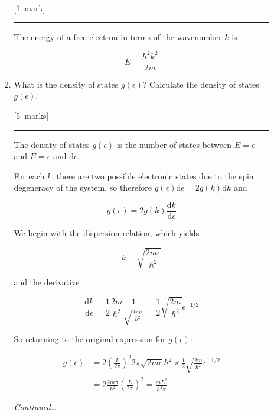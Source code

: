 \documentclass[12pt,a4paper]{article}
\newcommand{\sepline}[0]{\par \hfil\rule{10cm}{0.4pt} \vspace*{\parskip}\hfil}
\begin{document}
\begin{enumerate}
\begin{enumerate}
\begin{enumerate}
						\hfill{[1~mark]}

						\begin{answer}

							\sepline

							The energy of a free electron in terms of the wavenumber $k$ is

							$$ E = \frac{\hbar^2 k^2}{2m} $$

						\end{answer}

						\item What is the density of states $g(\epsilon)$? Calculate the density of states $g(\epsilon)$.

						\hfill{[5~marks]}

						\begin{answer}

							\sepline

							The density of states $g(\epsilon)$ is the number of states between $E = \epsilon$ and $E = \epsilon$ and $\mathrm{d}\epsilon$.

							For each $k$, there are two possible electronic states due to the spin degeneracy of the system, so therefore $g(\epsilon) \mathrm{d}\epsilon = 2 g(k) \mathrm{d} k$ and

							$$ g(\epsilon) = 2 g(k) \frac{\mathrm{d}k}{\mathrm{d}\epsilon} $$

							We begin with the dispersion relation, which yields

							$$ k = \sqrt{\frac{2m\epsilon}{\hbar^2}} $$

							and the derivative

							$$ \frac{\mathrm{d}k}{\mathrm{d}\epsilon} = \frac{1}{2}\frac{2m}{\hbar^2}\frac{1}{\sqrt{\frac{2m\epsilon}{\hbar^2}}} = \frac{1}{2} \sqrt{\frac{2m}{\hbar^2}} \epsilon^{-1/2} $$

							So returning to the original expression for $g(\epsilon)$:

							$$ \begin{aligned}
							g(\epsilon) & = 2 \left(\frac{L}{2\pi}\right)^2 2 \pi \sqrt{2m\epsilon}{\hbar^2} \times \frac{1}{2} \sqrt{\frac{2m}{\hbar^2}} \epsilon^{-1/2} \\
							& = 2 \frac{2m\pi}{\hbar^2} \left(\frac{L}{2\pi}\right)^2 = \frac{m L^2}{\hbar^2 \pi}
							\end{aligned} $$

						\end{answer}

						\vfill \textit{Continued\ldots} \newpage


\end{enumerate}
\end{enumerate}
\end{enumerate}
\end{document}
